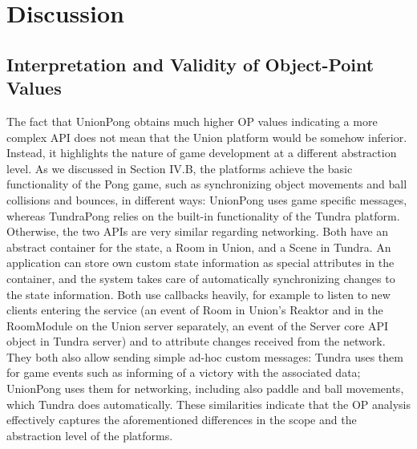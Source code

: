 \documentclass[conference]{IEEEtran}
\begin{document}
\section{Discussion}

\subsection{Interpretation and Validity of Object-Point Values}

The fact that UnionPong obtains much higher OP values indicating a
more complex API does not mean that the Union platform would be
somehow inferior. Instead, it highlights the nature of game
development at a different abstraction level. As we discussed in
Section IV.B, the platforms achieve the basic functionality of the
Pong game, such as synchronizing object movements and ball collisions
and bounces, in different ways: UnionPong uses game specific messages,
whereas TundraPong relies on the built-in functionality of the Tundra
platform. Otherwise, the two APIs are very similar regarding
networking. Both have an abstract container for the state, a Room in
Union, and a Scene in Tundra. An application can store own custom
state information as special attributes in the container, and the
system takes care of automatically synchronizing changes to the state
information. Both use callbacks heavily, for example to listen to new
clients entering the service (an event of Room in Union’s Reaktor and
in the RoomModule on the Union server separately, an event of the
Server core API object in Tundra server) and to attribute changes
received from the network. They both also allow sending simple ad-hoc
custom messages: Tundra uses them for game events such as informing of
a victory with the associated data; UnionPong uses them for
networking, including also paddle and ball movements, which Tundra
does automatically. These similarities indicate that the OP analysis
effectively captures the aforementioned differences in the scope and
the abstraction level of the platforms.
\end{document}
